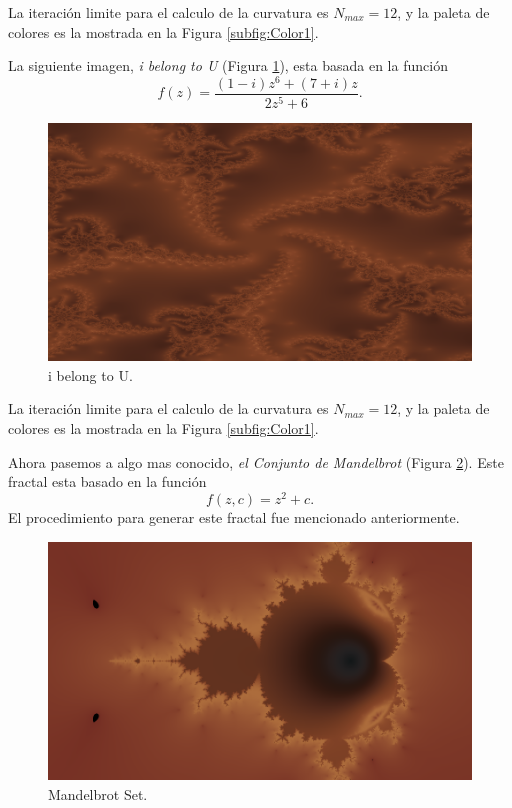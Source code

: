 \documentclass[12pt,letterpaper,final]{article}
\theoremstyle{plain}
\theoremstyle{definition}
\theoremstyle{remark}
\numberwithin{equation}{section}
\begin{document}
La iteración limite para el calculo de la curvatura es $N_{max} = 12$, y la paleta de colores es la mostrada en la Figura \ref{subfig:Color1}. \vspace{24pt}

\newpage
La siguiente imagen, \textit{i belong to U} (Figura \ref{fig:i belong to U}), esta basada en la función
\[ f(z) = \frac{(1-i)z^6 + (7+i)z}{2z^5 + 6}. \]

\begin{figure}[!hbtp]
\centering
\includegraphics[scale=0.5]{../src/curvature_estimation/i_belong_to_U/results/i_belong_to_U_12_960x540.png} 
\caption{i belong to U.}
\label{fig:i belong to U}
\end{figure}

La iteración limite para el calculo de la curvatura es $N_{max} = 12$, y la paleta de colores es la mostrada en la Figura \ref{subfig:Color1}. \vspace{24pt}

\newpage
Ahora pasemos a algo mas conocido, \textit{el Conjunto de Mandelbrot} (Figura \ref{fig:Mandelbrot Set}). Este fractal esta basado en la función
\[ f(z, c) = z^2 + c. \]
El procedimiento para generar este fractal fue mencionado anteriormente.

\begin{figure}[!hbtp]
\centering
\includegraphics[scale=0.5]{../src/curvature_estimation/Mandelbrot_Set/results/MandelbrotSet_32_960x540.png} 
\caption{Mandelbrot Set.}
\label{fig:Mandelbrot Set}
\end{figure}
\end{document}
